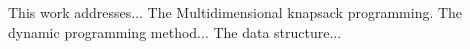 This work addresses...
The Multidimensional knapsack programming.
The dynamic programming method...
The data structure...
